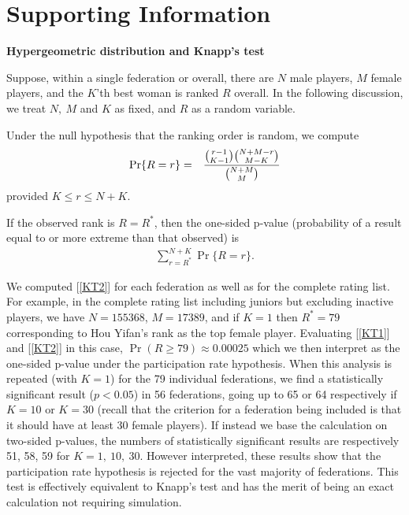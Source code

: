 \documentclass[9pt,twocolumn,twoside,lineno]{pnas-new}
\begin{document}

\showacknow{} %


\section*{Supporting Information}



\textbf{Hypergeometric distribution and Knapp's test}
\medskip

Suppose, within a single federation or overall, there are $N$ male players, $M$ female players, and the $K$'th best woman is ranked $R$ overall. In the following discussion, we treat $N,\ M$ and $K$ as fixed, and $R$ as a random variable.

Under the null hypothesis that the ranking order is random, we compute
\begin{eqnarray}
\Pr\{R=r\} & = & {{r-1 \choose K-1}{N+M-r\choose M-K}\over {N+M \choose M}}
\label{KT1}
\end{eqnarray}
provided $K\le r\le N+K$.

If the observed rank is $R=R^*$, then the one-sided p-value (probability of a result equal to or more extreme than that observed) is
\begin{eqnarray}
\sum_{r=R^*}^{N+K}\Pr\{R=r\}.
\label{KT2}
\end{eqnarray}

We computed [\ref{KT2}] for each federation as well as for the complete rating list. For example, in the complete rating list including juniors but excluding inactive players, we have $N=155368$, $M=17389$, and if $K=1$ then $R^*=79$ corresponding to Hou Yifan's rank as the top female player. Evaluating [\ref{KT1}] and [\ref{KT2}] in this case, $\Pr(R\ge 79)\approx 0.00025$ which we then interpret as the one-sided p-value under the participation rate hypothesis. When this analysis is repeated (with $K=1$) for the 79 individual federations, we find a statistically significant result ($p<0.05$) in 56 federations, going up to 65 or 64 respectively if $K=10$ or $K=30$ (recall that the criterion for a federation being included is that it should have at least 30 female players). If instead we base the calculation on two-sided p-values, the numbers of statistically significant results are respectively 51, 58, 59 for $K=1,\ 10,\ 30$. However interpreted, these results show that the participation rate hypothesis is rejected for the vast majority of federations. This test is effectively equivalent to Knapp's test \cite{knapp2010prsb} and has the merit of being an exact calculation not requiring simulation.
\end{document}
